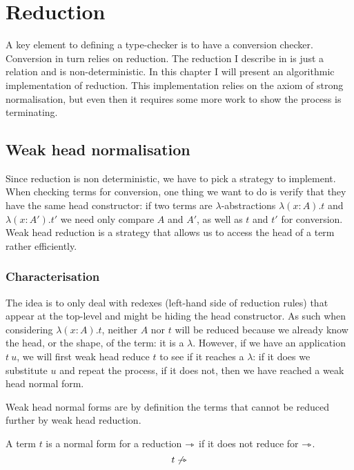 \chapter{Reduction}

A key element to defining a type-checker is to have a conversion checker.
Conversion in turn relies on reduction. The reduction I describe in
 is just a relation and is non-deterministic. In this chapter
I will present an algorithmic implementation of reduction.
This implementation relies on the axiom of strong normalisation, but even then
it requires some more work to show the process is terminating.

\section{Weak head normalisation}

Since reduction is non deterministic, we have to pick a strategy to implement.
When checking terms for conversion, one thing we want to do is verify that they
have the same head constructor: if two terms are \(\lambda\)-abstractions
\(\lambda (x:A).t\) and \(\lambda (x:A').t'\) we need only compare \(A\) and
\(A'\), as well as \(t\) and \(t'\) for conversion.
Weak head reduction is a strategy that allows us to access the head of a term
rather efficiently.

\subsection{Characterisation}

The idea is to only deal with redexes (\ie left-hand side of reduction rules)
that appear at the top-level and might be hiding the head constructor. As such
when considering \(\lambda (x:A).t\), neither \(A\) nor \(t\) will be reduced
because we already know the head, or the shape, of the term: it is a
\(\lambda\). However, if we have an application \(t\ u\), we will first weak
head reduce \(t\) to see if it reaches a \(\lambda\): if it does we substitute
\(u\) and repeat the process, if it does not, then we have reached a weak head
normal form.

Weak head normal forms are by definition the terms that cannot be reduced
further by weak head reduction.

\begin{definition}
  A term \(t\) is a normal form for a reduction \(\rightarrowtriangle\) if it does not reduce
  for \(\rightarrowtriangle\).
  \[
    t \not \rightarrowtriangle
  \]
\end{definition}


